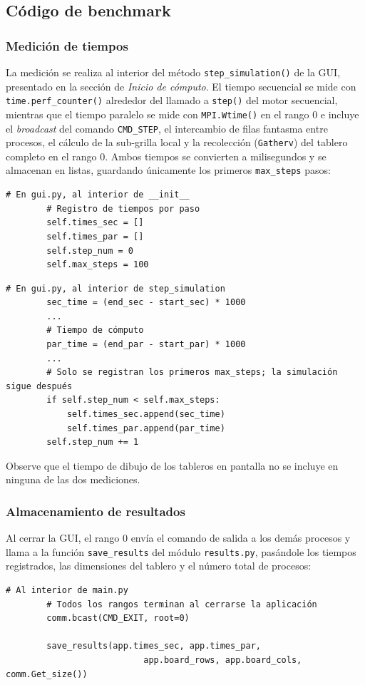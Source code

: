 \documentclass{article}
\begin{document}
\subsection{Código de benchmark}

\subsubsection{Medición de tiempos}
La medición se realiza al interior del método \verb|step_simulation()| de la GUI, presentado en la sección de \textit{Inicio de cómputo}. El tiempo secuencial se mide con \verb|time.perf_counter()| alrededor del llamado a \verb|step()| del motor secuencial, mientras que el tiempo paralelo se mide con \verb|MPI.Wtime()| en el rango 0 e incluye el \textit{broadcast} del comando \verb|CMD_STEP|, el intercambio de filas fantasma entre procesos, el cálculo de la sub-grilla local y la recolección (\verb|Gatherv|) del tablero completo en el rango 0. Ambos tiempos se convierten a milisegundos y se almacenan en listas, guardando únicamente los primeros \verb|max_steps| pasos:
\begin{verbatim}
# En gui.py, al interior de __init__
        # Registro de tiempos por paso
        self.times_sec = []
        self.times_par = []
        self.step_num = 0
        self.max_steps = 100
\end{verbatim}

\begin{verbatim}
# En gui.py, al interior de step_simulation
        sec_time = (end_sec - start_sec) * 1000
        ...
        # Tiempo de cómputo
        par_time = (end_par - start_par) * 1000
        ...
        # Solo se registran los primeros max_steps; la simulación sigue después
        if self.step_num < self.max_steps:
            self.times_sec.append(sec_time)
            self.times_par.append(par_time)
        self.step_num += 1
\end{verbatim}

Observe que el tiempo de dibujo de los tableros en pantalla no se incluye en ninguna de las dos mediciones.

\subsubsection{Almacenamiento de resultados}
Al cerrar la GUI, el rango 0 envía el comando de salida a los demás procesos y llama a la función \verb|save_results| del módulo \verb|results.py|, pasándole los tiempos registrados, las dimensiones del tablero y el número total de procesos:
\begin{verbatim}
# Al interior de main.py
        # Todos los rangos terminan al cerrarse la aplicación
        comm.bcast(CMD_EXIT, root=0)

        save_results(app.times_sec, app.times_par,
                           app.board_rows, app.board_cols, comm.Get_size())
\end{verbatim}
\end{document}

